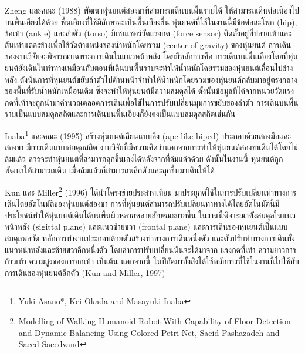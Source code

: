 \clearpage
Zheng และคณะ (1988) พัฒนาหุ่นยนต์สองขาที่สามารถเดินบนพื้นราบได้ ให้สามารถเดินต่อเนื่องไปบนพื้นเอียงได้ด้วย
พื้นเอียงที่ใช้มีลักษณะเป็นพื้นเอียงขึ้น หุ่นยนต์ที่ใช้ในงานนี้มีข้อต่อสะโพก (hip), ข้อเท้า (ankle) และลำตัว (torso) มีเซนเซอร์วัดแรงกด (force sensor)
ติดตั้งอยู่ที่ปลายเท้าและส้นเท้าแต่ละข้างเพื่อใช้วัดตำแหน่งของน้ำหนักโดยรวม (center of gravity) ของหุ่นยนต์ การเดินของงานวิจัยจะพิจารณาเฉพาะการเดินในแนวหน้าหลัง
โดยมีหลักการคือ การเดินบนพื้นเอียงโดยที่หุ่นยนต์ยังเดินในท่าทางเหมือนกับตอนที่เดินบนพื้นราบจะทำให้น้ำหนักโดยรวมของหุ่นยนต์เลื่อนไปข้างหลัง
ดังนั้นการที่หุ่นยนต์ขยับลำตัวไปด้านหน้าจำทำให้น้ำหนักโดยรวมของหุ่นยนต์กลับมาอยู่ตรงกลางของพื้นที่รับน้ำหนักเหมือนเดิม
ซึ่งจะทำให้หุ่นยนต์มีความสมดุลได้ ดั้งนั้นข้อมูลที่ได้จากหน่วยวัดแรงกดที่เท้าจะถูกนำมาคำนวณตลอดการเดินเพื่อใช้ในการปรับเปลี่ยนมุมการขยับของลำตัว
การเดินบนพื้นราบเป็นแบบสมดุลสถิตและการเดินบนพื้นเอียงก็ยังคงเป็นแบบสมดุลสถิตเช่นกัน

Inaba\footnote{Yuki Asano*, Kei Okada and Masayuki Inaba} และคณะ (1995) สร้างหุ่นยนต์เลียนแบบลิง (ape-like biped) ประกอบด้วยสองมือและสองขา มีการเดินแบบสมดุลสถิต
งานวิจัยนี้มีความคิดว่านอกจากการทำให้หุ่นยนต์สองขาเดินได้โดยไม่ล้มแล้ว ควรจะทำหุ่นยนต์ที่สามารถลุกขึ้นเองได้หลังจากที่ล้มแล้วด้วย
ดังนั้นในงานนี้ หุ่นยนต์ถูกพัฒนาให้สามารถเดิน เมื่อล้มแล้วก็สามารถพลิกตัวและลุกขึ้นมาเดินให้ได้

Kun และ Miller\footnote{Modelling of Walking Humanoid Robot With 
Capability of Floor Detection and Dynamic 
Balancing Using Colored Petri Net, Saeid Pashazadeh and Saeed Saeedvand} (1996) ได้นำโครงข่ายประสาทเทียม มาประยุกต์ใช้ในการปรับเปลี่ยนท่าทางการเดินโดยอัตโนมัติของหุ่นยนต์สองขา
การที่หุ่นยนต์สามารถปรับเปลี่ยนท่าทางได้โดยอัตโนมัตินี้มีประโยชน์ทำให้หุ่นยนต์เดินได้บนพื้นผิวหลากหลายลักษณะมากขึ้น
ในงานนี้พิจารณาท้ังสมดุลในแนวหน้าหลัง (sigittal plane) และแนวซ้ายขวา (frontal plane) และการเดินของหุุ่นยนต์เป็นแบบสมดุลพลวัต
หลักการทำงานประกอบด้วยตัวสร้างท่าทางการเดินหนึ่งตัว และตัวปรับท่าทางการเดินทั้งแนวหน้าหลังและซ้ายขวาอีกหนึ่งตัว
โดยค่าการปรับเปลี่ยนนั้นจะได้มาจาก แรงกดที่เท้า ความยาวการก้าวเท้า ความสูงของการยกเท้า เป็นต้น นอกจากนี้
ในปีถัดมาทั้งสิงได้ใช้หลักการที่ใช้ในงานนี้ไปใช้กับการเดินของหุ่นยนต์อีกตัว (Kun and Miller, 1997)

